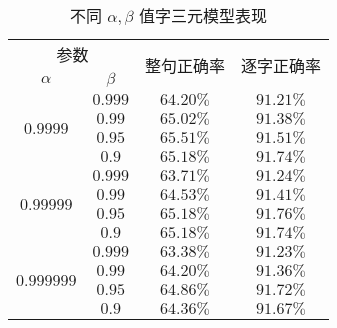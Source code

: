 \documentclass[a4paper]{article}
\begin{document}
    \begin{table}[H]
        \centering
        \begin{tabular}{cccc}
            \toprule
            \multicolumn{2}{c}{参数} & \multicolumn{1}{c}{\multirow{2}{*}{整句正确率}} & \multirow{2}{*}{逐字正确率} \\
            $\alpha$ & \multicolumn{1}{c}{$\beta$} & \multicolumn{1}{c}{} & \multicolumn{1}{c}{} \\ \cline{1-4}
            \multicolumn{1}{c}{\multirow{4}{*}{$0.9999$}} & \multicolumn{1}{|c|}{$0.999$} & \multicolumn{1}{c}{$64.20\%$} & \multicolumn{1}{c}{$91.21\%$} \\ \cline{2-4}
            \multicolumn{1}{c}{} & \multicolumn{1}{|c|}{$0.99$} & \multicolumn{1}{c}{$65.02\%$} & \multicolumn{1}{c}{$91.38\%$} \\ \cline{2-4}
            \multicolumn{1}{c}{} & \multicolumn{1}{|c|}{$0.95$} & \multicolumn{1}{c}{$\pmb{65.51\%}$} & \multicolumn{1}{c}{$91.51\%$} \\ \cline{2-4}
            \multicolumn{1}{c}{} & \multicolumn{1}{|c|}{$0.9$} & \multicolumn{1}{c}{$65.18\%$} & \multicolumn{1}{c}{$91.74\%$} \\ \cline{1-4}
            \multicolumn{1}{c}{\multirow{4}{*}{$0.99999$}} & \multicolumn{1}{|c|}{$0.999$} & \multicolumn{1}{c}{$63.71\%$} & \multicolumn{1}{c}{$91.24\%$} \\ \cline{2-4}
            \multicolumn{1}{c}{} & \multicolumn{1}{|c|}{$0.99$} & \multicolumn{1}{c}{$64.53\%$} & \multicolumn{1}{c}{$91.41\%$} \\ \cline{2-4}
            \multicolumn{1}{c}{} & \multicolumn{1}{|c|}{$0.95$} & \multicolumn{1}{c}{$65.18\%$} & \multicolumn{1}{c}{$\pmb{91.76\%}$} \\ \cline{2-4}
            \multicolumn{1}{c}{} & \multicolumn{1}{|c|}{$0.9$} & \multicolumn{1}{c}{$65.18\%$} & \multicolumn{1}{c}{$91.74\%$} \\ \cline{1-4}
            \multicolumn{1}{c}{\multirow{4}{*}{$0.999999$}} & \multicolumn{1}{|c|}{$0.999$} & \multicolumn{1}{c}{$63.38\%$} & \multicolumn{1}{c}{$91.23\%$} \\ \cline{2-4}
            \multicolumn{1}{c}{} & \multicolumn{1}{|c|}{$0.99$} & \multicolumn{1}{c}{$64.20\%$} & \multicolumn{1}{c}{$91.36\%$} \\ \cline{2-4}
            \multicolumn{1}{c}{} & \multicolumn{1}{|c|}{$0.95$} & \multicolumn{1}{c}{$64.86\%$} & \multicolumn{1}{c}{$91.72\%$} \\ \cline{2-4}
            \multicolumn{1}{c}{} & \multicolumn{1}{|c|}{$0.9$} & \multicolumn{1}{c}{$64.36\%$} & \multicolumn{1}{c}{$91.67\%$} \\
            \bottomrule
        \end{tabular}
        \caption{不同 $\alpha, \beta$ 值字三元模型表现}
	    \label{tab2}
    \end{table}
\end{document}
